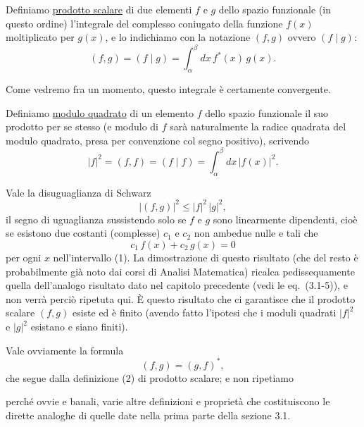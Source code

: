 \documentclass[11pt, a4paper]{book}
\numberwithin{equation}{section}
\begin{document}

Definiamo \underline{prodotto scalare} di due elementi $f$ e $g$ dello
spazio funzionale (in questo ordine) l'integrale del complesso coniugato
della funzione $f(x)$ moltiplicato per $g(x)$, e lo indichiamo con la
notazione $(f,g)$ ovvero $(f\mid g)$:
\begin{equation}
(f,g) = (f\mid g) = \int_\alpha^\beta dx\, f^*(x)\,g(x).
\end{equation}

Come vedremo fra un momento, questo integrale è certamente convergente.

Definiamo \underline{modulo quadrato} di un elemento $f$ dello spazio
funzionale il suo prodotto per se stesso (e modulo di $f$ sarà
naturalmente la radice quadrata del modulo quadrato, presa per
convenzione col segno positivo), scrivendo
\begin{equation}
|f|^2 = (f,f) = (f\mid f) = \int_\alpha^\beta dx\,|f(x)|^2.
\end{equation}

Vale la disuguaglianza di Schwarz
\begin{equation}
|(f,g)|^2 \leq |f|^2\,|g|^2,
\end{equation}
il segno di uguaglianza sussistendo solo se $f$ e $g$ sono linearmente
dipendenti, cioè se esistono due costanti (complesse) $c_1$ e $c_2$ non
ambedue nulle e tali che
\begin{equation}
c_1\,f(x) + c_2\,g(x) = 0
\end{equation}
per ogni $x$ nell'intervallo (1). La dimostrazione di questo risultato
(che del resto è probabilmente già noto dai corsi di Analisi Matematica)
ricalca pedissequamente quella dell'analogo risultato dato nel capitolo
precedente (vedi le eq.\ (3.1-5)), e non verrà perciò ripetuta qui. È
questo risultato che ci garantisce che il prodotto scalare $(f,g)$ esiste
ed è finito (avendo fatto l'ipotesi che i moduli quadrati $|f|^2$ e
$|g|^2$ esistano e siano finiti).

Vale ovviamente la formula
\begin{equation}
(f,g) = (g,f)^*,
\end{equation}
che segue dalla definizione (2) di prodotto scalare; e non ripetiamo


perché ovvie e banali, varie altre definizioni e proprietà che
costituiscono le dirette analoghe di quelle date nella prima parte della
sezione 3.1.
\end{document}
